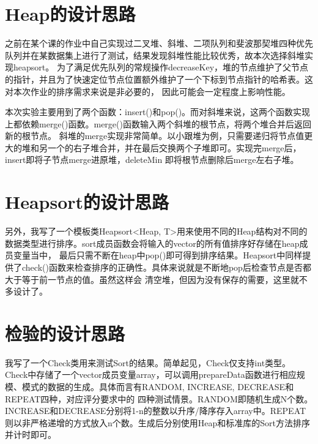 \documentclass[UTF8]{ctexart}
\begin{document}
\pagestyle{fancy}
\fancyhead{}

\section{Heap的设计思路}

\par 之前在某个课的作业中自己实现过二叉堆、斜堆、二项队列和斐波那契堆四种优先队列并在某数据集上进行了测试，结果发现斜堆性能比较优秀，故本次选择斜堆实现heapsort。
为了满足优先队列的常规操作decreaseKey，堆的节点维护了父节点的指针，并且为了快速定位节点位置额外维护了一个下标到节点指针的哈希表。这对本次作业的排序需求来说是非必要的，
因此可能会一定程度上影响性能。

\par 本次实验主要用到了两个函数：insert()和pop()。而对斜堆来说，这两个函数实现上都依赖merge()函数。merge()函数输入两个斜堆的根节点，将两个堆合并后返回新的根节点。
斜堆的merge实现非常简单。以小跟堆为例，只需要递归将节点值更大的堆和另一个的右子堆合并，并在最后交换两个子堆即可。实现完merge后，insert即将子节点merge进原堆，deleteMin
即将根节点删除后merge左右子堆。


\section{Heapsort的设计思路}

\par 另外，我写了一个模板类Heapsort<Heap, T>用来使用不同的Heap结构对不同的数据类型进行排序。sort成员函数会将输入的vector的所有值排序好存储在heap成员变量当中，
最后只需不断在heap中pop()即可得到排序结果。Heapsort中同样提供了check()函数来检查排序的正确性。具体来说就是不断地pop后检查节点是否都大于等于前一节点的值。虽然这样会
清空堆，但因为没有保存的需要，这里就不多设计了。

\section{检验的设计思路}

\par 我写了一个Check类用来测试Sort的结果。简单起见，Check仅支持int类型。Check中存储了一个vector成员变量array，可以调用prepareData函数进行相应规模、模式的数据的生成。具体而言有RANDOM, INCREASE, DECREASE和REPEAT四种，对应评分要求中的
四种测试情景。RANDOM即随机生成N个数。INCREASE和DECREASE分别将1-n的整数以升序/降序存入array中。REPEAT则以非严格递增的方式放入n个数。生成后分别使用Heap和标准库的Sort方法排序并计时即可。
\end{document}
